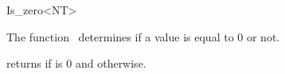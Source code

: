 \begin{ccRefFunctionObjectClass}{Is_zero<NT>}

\ccDefinition

The function \ccRefName\ determines if a value is equal to 0 or not.


\ccIsModel
{}

{returns  if  is 0 and  otherwise.}

\end{ccRefFunctionObjectClass}
